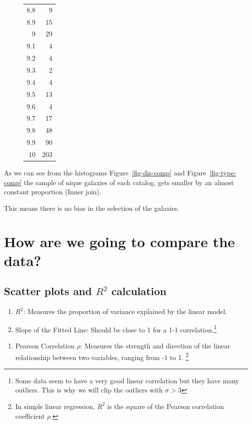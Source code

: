 \documentclass[
]{article}
\providecommand{\tightlist}{%
  \setlength{\itemsep}{0pt}\setlength{\parskip}{0pt}}\usepackage{longtable,booktabs,array}
\begin{document}
\begin{figure}
\begin{minipage}{0.50\linewidth}
\begin{longtable}[]{@{}rr@{}}
8.8 & 9 \\
8.9 & 15 \\
9 & 29 \\
9.1 & 4 \\
9.2 & 4 \\
9.3 & 2 \\
9.4 & 4 \\
9.5 & 13 \\
9.6 & 4 \\
9.7 & 17 \\
9.8 & 48 \\
9.9 & 90 \\
10 & 203 \\
\end{longtable}

\end{minipage}%

\end{figure}%

As we can see from the histograms Figure~\ref{fig-dis-comp} and
Figure~\ref{fig-type-comp} the sample of nique galaxies of each catalog,
gets smaller by an almost constant proportion (Inner join).

This means there is no bias in the selection of the galaxies.

\section{How are we going to compare the
data?}\label{how-are-we-going-to-compare-the-data}

\subsection{\texorpdfstring{Scatter plots and \(R^2\)
calculation}{Scatter plots and R\^{}2 calculation}}\label{scatter-plots-and-r2-calculation}

\begin{enumerate}
\def\labelenumi{\arabic{enumi}.}
\tightlist
\item
  \(R^2\): Measures the proportion of variance explained by the linear
  model.
\item
  Slope of the Fitted Line: Should be close to 1 for a 1-1
  correlation.\footnote{Some data seem to have a very good linear
    correlation but they have many outliers. This is why we will clip
    the outliers with \(\sigma > 3\)}
\end{enumerate}

\begin{enumerate}
\def\labelenumi{\arabic{enumi}.}
\setcounter{enumi}{2}
\tightlist
\item
  Pearson Correlation \(\rho\): Measures the strength and direction of
  the linear relationship between two variables, ranging from -1 to 1.
  \footnote{In simple linear regression, \(R^2\) is the square of the
    Pearson correlation coefficient \(\rho\).}
\end{enumerate}
\end{document}
